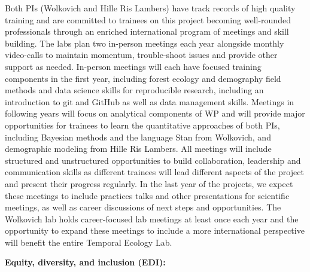 \documentclass[11pt]{article}
\begin{document}
Both PIs (Wolkovich and Hille Ris Lambers) have track records of high quality training and are committed to trainees on this project becoming well-rounded professionals through an enriched international program of meetings and skill building. The labs plan two in-person meetings each year  alongside monthly video-calls to maintain momentum, trouble-shoot issues and provide other support as needed. In-person meetings will each have focused training components in the first year, including forest ecology and demography field methods and data science skills for reproducible research, including an introduction to git and GitHub as well as data management skills. Meetings in following years will focus on analytical components of WP and will provide major opportunities for trainees to learn the quantitative approaches of both PIs, including Bayesian methods and the language Stan from Wolkovich, and demographic modeling from Hille Ris Lambers. All meetings will include structured and unstructured opportunities to build collaboration, leadership and communication skills as different trainees will lead different aspects of the project and present their progress regularly. In the last year of the projects, we expect these meetings to include practices talks and other presentations for scientific meetings, as well as career discussions of next steps and opportunities. The Wolkovich lab holds career-focused lab meetings at least once each year and the opportunity to expand these meetings to include a more international perspective will benefit the entire Temporal Ecology Lab. 

{\bf Equity, diversity, and inclusion (EDI):}  %
\end{document}
